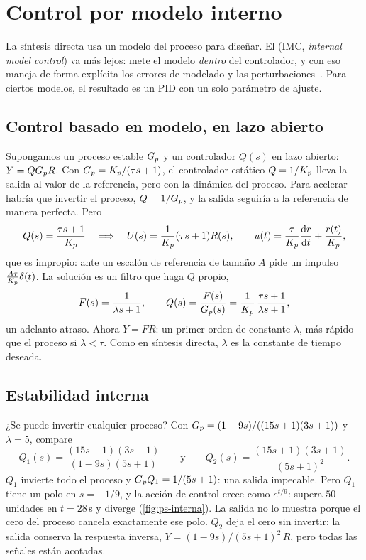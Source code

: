 \section{Control por modelo interno}
\label{sec:ps-imc}

La síntesis directa usa un modelo del proceso para diseñar. El  (IMC, \emph{internal model control}) va más lejos: mete el modelo \emph{dentro} del controlador, y con eso maneja de forma explícita los errores de modelado y las perturbaciones~\citep{GaMo82,RMS86}. Para ciertos modelos, el resultado es un PID con un solo parámetro de ajuste.

\subsection{Control basado en modelo, en lazo abierto}

Supongamos un proceso estable $G_p$ y un controlador $Q(s)$ en lazo abierto: $Y=QG_p R$. Con $G_p=K_p/(\tau s+1)$, el controlador estático $Q=1/K_p$ lleva la salida al valor de la referencia, pero con la dinámica del proceso. Para acelerar habría que invertir el proceso, $Q=1/G_p$, y la salida seguiría a la referencia de manera perfecta. Pero
\[
  Q(s)=\frac{\tau s+1}{K_p}
  \quad\Longrightarrow\quad
  U(s)=\frac{1}{K_p}(\tau s+1)R(s),
  \qquad
  u(t)=\frac{\tau}{K_p}\frac{\mathrm{d} r}{\mathrm{d} t}+\frac{r(t)}{K_p},
\]
que es impropio: ante un escalón de referencia de tamaño $A$ pide un impulso $\frac{A\tau}{K_p}\delta(t)$. La solución es un filtro que haga $Q$ propio,
\begin{equation}
  F(s)=\frac{1}{\lambda s+1},\qquad Q(s)=\frac{F(s)}{G_p(s)}=\frac{1}{K_p}\,\frac{\tau s+1}{\lambda s+1},
  \label{eq:ps-q-filtro}
\end{equation}
un adelanto-atraso. Ahora $Y=F R$: un primer orden de constante $\lambda$, más rápido que el proceso si $\lambda<\tau$. Como en síntesis directa, $\lambda$ es la constante de tiempo deseada.

\subsection{Estabilidad interna}

¿Se puede invertir cualquier proceso? Con $G_p=(1-9s)/((15s+1)(3s+1))$ y $\lambda=5$, compare
\[
  Q_1(s)=\frac{(15s+1)(3s+1)}{(1-9s)(5s+1)}
  \qquad\text{y}\qquad
  Q_2(s)=\frac{(15s+1)(3s+1)}{(5s+1)^2} .
\]
$Q_1$ invierte todo el proceso y $G_p Q_1=1/(5s+1)$: una salida impecable. Pero $Q_1$ tiene un polo en $s=+1/9$, y la acción de control crece como $e^{t/9}$: supera $50$ unidades en $t=28$\,s y diverge (\cref{fig:ps-interna}). La salida no lo muestra porque el cero del proceso cancela exactamente ese polo. $Q_2$ deja el cero sin invertir; la salida conserva la respuesta inversa, $Y=(1-9s)/(5s+1)^2\,R$, pero todas las señales están acotadas.

